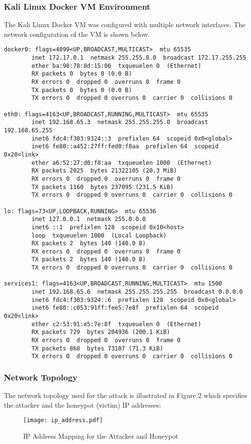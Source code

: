 \documentclass{article}
\begin{document}
\subsubsection*{Kali Linux Docker VM Environment}
The Kali Linux Docker VM was configured with multiple network interfaces. The network configuration of the VM is shown below.
\begin{lstlisting}[language=text, caption={Kali Linux Docker VM ifconfig Output}, label={lst:ifconfig}]
docker0: flags=4099<UP,BROADCAST,MULTICAST>  mtu 65535
        inet 172.17.0.1  netmask 255.255.0.0  broadcast 172.17.255.255
        ether ba:98:78:8d:15:06  txqueuelen 0  (Ethernet)
        RX packets 0  bytes 0 (0.0 B)
        RX errors 0  dropped 0  overruns 0  frame 0
        TX packets 0  bytes 0 (0.0 B)
        TX errors 0  dropped 0 overruns 0  carrier 0  collisions 0

eth0: flags=4163<UP,BROADCAST,RUNNING,MULTICAST>  mtu 65535
        inet 192.168.65.3  netmask 255.255.255.0  broadcast 192.168.65.255
        inet6 fdc4:f303:9324::3  prefixlen 64  scopeid 0x0<global>
        inet6 fe80::a452:27ff:fed0:f8aa  prefixlen 64  scopeid 0x20<link>
        ether a6:52:27:d0:f8:aa  txqueuelen 1000  (Ethernet)
        RX packets 2025  bytes 21322105 (20.3 MiB)
        RX errors 0  dropped 0  overruns 0  frame 0
        TX packets 1160  bytes 237095 (231.5 KiB)
        TX errors 0  dropped 0 overruns 0  carrier 0  collisions 0

lo: flags=73<UP,LOOPBACK,RUNNING>  mtu 65536
        inet 127.0.0.1  netmask 255.0.0.0
        inet6 ::1  prefixlen 128  scopeid 0x10<host>
        loop  txqueuelen 1000  (Local Loopback)
        RX packets 2  bytes 140 (140.0 B)
        RX errors 0  dropped 0  overruns 0  frame 0
        TX packets 2  bytes 140 (140.0 B)
        TX errors 0  dropped 0 overruns 0  carrier 0  collisions 0

services1: flags=4163<UP,BROADCAST,RUNNING,MULTICAST>  mtu 1500
        inet 192.168.65.6  netmask 255.255.255.255  broadcast 0.0.0.0
        inet6 fdc4:f303:9324::6  prefixlen 128  scopeid 0x0<global>
        inet6 fe80::c053:91ff:fee5:7e8f  prefixlen 64  scopeid 0x20<link>
        ether c2:53:91:e5:7e:8f  txqueuelen 0  (Ethernet)
        RX packets 729  bytes 204936 (200.1 KiB)
        RX errors 0  dropped 0  overruns 0  frame 0
        TX packets 868  bytes 73107 (71.3 KiB)
        TX errors 0  dropped 0 overruns 0  carrier 0  collisions 0
\end{lstlisting}
\newpage 
\subsubsection*{Network Topology}
The network topology used for the attack is illustrated in Figure 2 which specifies the attacker and the honeypot (victim) IP addresses:
\begin{figure}[h!]
    \centering
    \texttt{[image: ip\_address.pdf]}  %
    \caption{IP Address Mapping for the Attacker and Honeypot}
    \label{fig:ip_mapping}
\end{figure}
\end{document}
